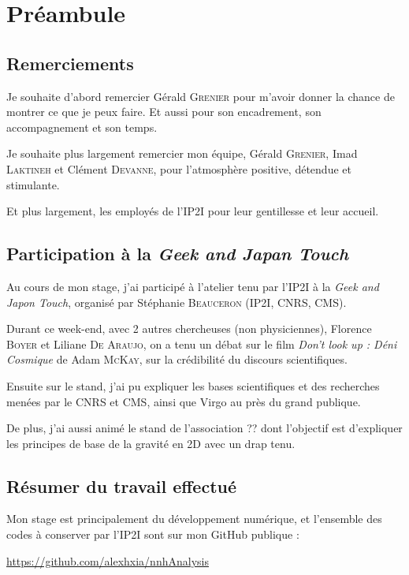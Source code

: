 \chapter*{Préambule}

\section*{Remerciements}

Je souhaite d'abord remercier Gérald \textsc{Grenier} pour m'avoir donner la chance de montrer ce que je peux faire. Et aussi pour son encadrement, son accompagnement et son temps.

Je souhaite plus largement remercier mon équipe, Gérald \textsc{Grenier}, Imad \textsc{Laktineh} et Clément \textsc{Devanne}, pour l'atmosphère positive, détendue et stimulante.

Et plus largement, les employés de l'IP2I pour leur gentillesse et leur accueil.

\section*{Participation à la \textit{Geek and Japan Touch}}

Au cours de mon stage, j'ai participé à l'atelier tenu par l'IP2I à la \textit{Geek and Japon Touch}, organisé par Stéphanie \textsc{Beauceron} (IP2I, CNRS, CMS).

Durant ce week-end, avec 2 autres chercheuses (non physiciennes), Florence \textsc{Boyer} et Liliane \textsc{De Araujo}, on a tenu un débat sur le film \textit{Don't look up : Déni Cosmique} de Adam \textsc{McKay}, sur la crédibilité du discours scientifiques.

Ensuite sur le stand, j'ai pu expliquer les bases scientifiques et des recherches menées par le CNRS et CMS, ainsi que Virgo au près du grand publique. 

De plus, j'ai aussi animé le stand de l'association ?? dont l'objectif est d'expliquer les principes de base de la gravité en 2D avec un drap tenu.

\section*{Résumer du travail effectué}

Mon stage est principalement du développement numérique, et l'ensemble des codes à conserver par l'IP2I sont sur mon GitHub publique : 

\url{https://github.com/alexhxia/nnhAnalysis}

